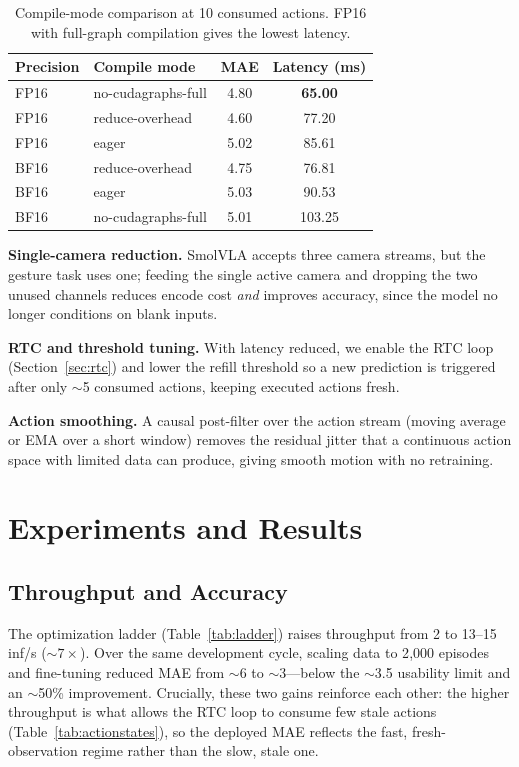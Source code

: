 \documentclass[blind]{gtac}
\begin{document}
\begin{table}[H]
\centering
\caption{Compile-mode comparison at 10 consumed actions. FP16 with full-graph
compilation gives the lowest latency.}
\label{tab:compile}
\footnotesize
\begin{tabular}{@{}llcc@{}}
\toprule
Precision & Compile mode & MAE & Latency (ms) \\
\midrule
FP16 & no-cudagraphs-full & 4.80 & \textbf{65.00} \\
FP16 & reduce-overhead & 4.60 & 77.20 \\
FP16 & eager & 5.02 & 85.61 \\
BF16 & reduce-overhead & 4.75 & 76.81 \\
BF16 & eager & 5.03 & 90.53 \\
BF16 & no-cudagraphs-full & 5.01 & 103.25 \\
\bottomrule
\end{tabular}
\end{table}

\textbf{Single-camera reduction.} SmolVLA accepts three camera streams, but the
gesture task uses one; feeding the single active camera and dropping the two
unused channels reduces encode cost \emph{and} improves accuracy, since the model
no longer conditions on blank inputs.

\textbf{RTC and threshold tuning.} With latency reduced, we enable the RTC loop
(Section~\ref{sec:rtc}) and lower the refill threshold so a new prediction is
triggered after only $\sim$5 consumed actions, keeping executed actions fresh.

\textbf{Action smoothing.} A causal post-filter over the action stream (moving
average or EMA over a short window) removes the residual jitter that a continuous
action space with limited data can produce, giving smooth motion with no
retraining.

\section{Experiments and Results}
\label{sec:results}

\subsection{Throughput and Accuracy}

The optimization ladder (Table~\ref{tab:ladder}) raises throughput from 2 to
13--15 inf/s ($\sim7\times$). Over the same development cycle, scaling data to
2{,}000 episodes and fine-tuning reduced MAE from $\sim$6 to $\sim$3---below the
$\sim$3.5 usability limit and an $\sim$50\% improvement. Crucially, these two
gains reinforce each other: the higher throughput is what allows the RTC loop to
consume few stale actions (Table~\ref{tab:actionstates}), so the deployed MAE
reflects the fast, fresh-observation regime rather than the slow, stale one.
\end{document}
